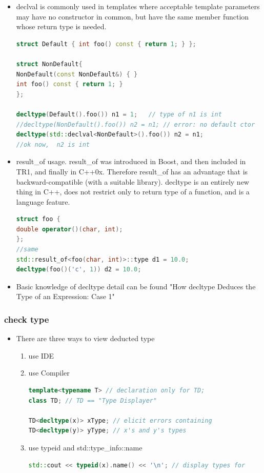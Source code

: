 \documentclass[a4paper,12pt,twoside]{book}
\begin{document}
\begin{itemize}
	\item declval is commonly used in templates where acceptable template parameters may have no constructor in common, but have the same member function whose return type is needed.
	
\begin{lstlisting}[frame=single, language=c++]
struct Default { int foo() const { return 1; } };

struct NonDefault{
NonDefault(const NonDefault&) { }
int foo() const { return 1; }
};
	
decltype(Default().foo()) n1 = 1;   // type of n1 is int
//decltype(NonDefault().foo()) n2 = n1; // error: no default ctor
decltype(std::declval<NonDefault>().foo()) n2 = n1;
//ok now,  n2 is int
\end{lstlisting}
	
	\item result\_of usage. result\_of was introduced in Boost, and then included in TR1, and finally in C++0x. Therefore result\_of has an advantage that is backward-compatible (with a suitable library). decltype is an entirely new thing in C++, does not restrict only to return type of a function, and is a language feature.
\begin{lstlisting}[frame=single, language=c++]
struct foo {
double operator()(char, int);
};
//same
std::result_of<foo(char, int)>::type d1 = 10.0;
decltype(foo()('c', 1)) d2 = 10.0;
\end{lstlisting}

\item Basic knowledge of decltype detail can be found "How decltype Deduces the Type of an Expression: Case 1"
\end{itemize}

\subsubsection{check type}

\begin{itemize}

	\item There are three ways to view deducted type
	\begin{enumerate}
		\item use IDE
		\item use Compiler
\begin{lstlisting}[frame=single, language=c++]
template<typename T> // declaration only for TD;
class TD; // TD == "Type Displayer"

TD<decltype(x)> xType; // elicit errors containing
TD<decltype(y)> yType; // x's and y's types
\end{lstlisting}

	\item use typeid and std::type\_info::name
	
\begin{lstlisting}[frame=single, language=c++]
std::cout << typeid(x).name() << '\n'; // display types for
\end{lstlisting}
		
	\end{enumerate}
	
\end{itemize}
\end{document}
